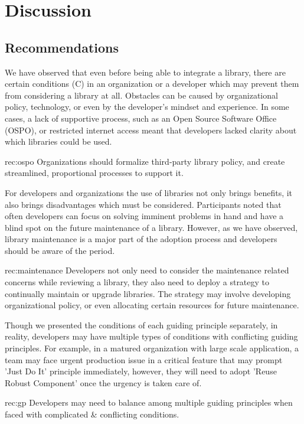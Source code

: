 
\section{Discussion}

\subsection{Recommendations}

We have observed that even before being able to integrate a library, there are certain conditions (C) in an organization or a developer which may prevent them from considering a library at all. Obstacles can be caused by organizational policy, technology, or even by the developer's mindset and experience. In some cases, a lack of supportive process, such as an Open Source Software Office (OSPO), or restricted internet access meant that developers lacked clarity about which libraries could be used. 
\begin{recommendation}{rec:ospo}
  {Organizations should formalize third-party library policy, and create streamlined, proportional processes to support it.}
\end{recommendation}\medskip

For developers and organizations the use of libraries not only brings benefits, it also brings disadvantages which must be considered. Participants noted that often developers can focus on solving imminent problems in hand and have a blind spot on the future maintenance of a library. However, as we have observed, library maintenance is a major part of the adoption process and developers should be aware of the  period. 
\begin{recommendation}{rec:maintenance}
  {Developers not only need to consider the maintenance related concerns while reviewing a library, they also need to deploy a strategy to continually maintain or upgrade libraries. The strategy may involve developing organizational policy, or even allocating certain resources for future maintenance.}
\end{recommendation}\medskip

Though we presented the conditions of each guiding principle separately, in reality, developers may have multiple types of conditions with conflicting guiding principles. For example, in a matured organization with large scale application, a team may face urgent production issue in a critical feature that may prompt 'Just Do It' principle immediately, however, they will need to adopt 'Reuse Robust Component' once the urgency is taken care of. %
\begin{recommendation}{rec:gp}
Developers may need to balance among multiple guiding principles when faced with complicated \& conflicting conditions. 
\end{recommendation}\medskip


